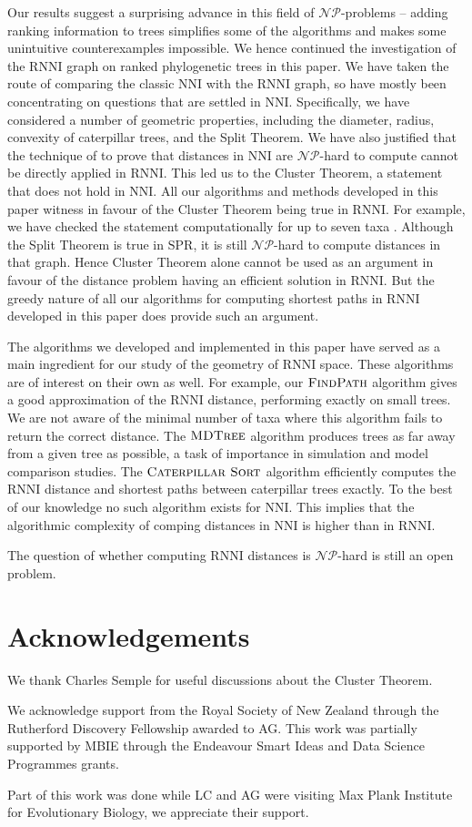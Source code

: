 \documentclass{amsart}
\newcommand{\np}{\mathcal{NP}}
\newcommand{\nni}{\mathrm{NNI}}
\newcommand{\rnni}{\mathrm{RNNI}}
\newcommand{\spr}{\mathrm{SPR}}
\newcommand{\csort}{\textsc{Caterpillar Sort}}
\newcommand{\findpath}{\textsc{FindPath}}
\newcommand{\mdtree}{\textsc{MDTree}}
\begin{document}
Our results suggest a surprising advance in this field of $\np$-problems -- adding ranking information to trees simplifies some of the algorithms and makes some unintuitive counterexamples impossible.
We hence continued the investigation of the $\rnni$ graph on ranked phylogenetic trees in this paper.
We have taken the route of comparing the classic $\nni$ with the $\rnni$ graph, so have mostly been concentrating on questions that are settled in $\nni$.
Specifically, we have considered a number of geometric properties, including the diameter, radius, convexity of caterpillar trees, and the Split Theorem.
We have also justified that the technique of \textcite{Dasgupta2000-xa} to prove that distances in $\nni$ are $\np$-hard to compute cannot be directly applied in $\rnni$.
This led us to the Cluster Theorem, a statement that does not hold in $\nni$.
All our algorithms and methods developed in this paper witness in favour of the Cluster Theorem being true in $\rnni$.
For example, we have checked the statement computationally for up to seven taxa \autocite{Collienne2019}.
Although the Split Theorem is true in $\spr$, it is still $\np$-hard to compute distances in that graph.
Hence Cluster Theorem alone cannot be used as an argument in favour of the distance problem having an efficient solution in $\rnni$.
But the greedy nature of all our algorithms for computing shortest paths in $\rnni$ developed in this paper does provide such an argument.

The algorithms we developed and implemented in this paper have served as a main ingredient for our study of the geometry of $\rnni$ space.
These algorithms are of interest on their own as well.
For example, our $\findpath$ algorithm gives a good approximation of the $\rnni$ distance, performing exactly on small trees.
We are not aware of the minimal number of taxa where this algorithm fails to return the correct distance.
The $\mdtree$ algorithm produces trees as far away from a given tree as possible, a task of importance in simulation and model comparison studies.
The $\csort$ algorithm efficiently computes the $\rnni$ distance and shortest paths between caterpillar trees exactly.
To the best of our knowledge no such algorithm exists for $\nni$.
This implies that the algorithmic complexity of comping distances in $\nni$ is higher than in $\rnni$.

The question of whether computing $\rnni$ distances is $\np$-hard is still an open problem.


\section*{Acknowledgements}
We thank Charles Semple for useful discussions about the Cluster Theorem.

We acknowledge support from the Royal Society of New Zealand through the Rutherford Discovery Fellowship awarded to AG.
This work was partially supported by MBIE through the Endeavour Smart Ideas and Data Science Programmes grants.

Part of this work was done while LC and AG were visiting Max Plank Institute for Evolutionary Biology, we appreciate their support.


\printbibliography
\end{document}
